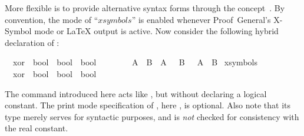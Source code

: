 \begin{isabellebody}
\begin{isamarkuptext}
  \medskip More flexible is to provide alternative syntax forms
  through the  concept~\cite{isabelle-ref}.  By
  convention, the mode of ``$xsymbols$'' is enabled whenever
  Proof~General's X-Symbol mode or {\LaTeX} output is active.  Now
  consider the following hybrid declaration of :%
\end{isamarkuptext}%
\isamarkuptrue%
%
\isadelimML
%
\endisadelimML
%
\isatagML
%
\endisatagML
{\isafoldML}%
%
\isadelimML
%
\endisadelimML
{}\isamarkupfalse%
\isanewline
\ \ xor\ {\isacharcolon}{\isacharcolon}\ {\isachardoublequoteopen}bool\ {\isasymRightarrow}\ bool\ {\isasymRightarrow}\ bool{\isachardoublequoteclose}\ \ \ \ {\isacharparenleft}\ {\isachardoublequoteopen}{\isacharbrackleft}{\isacharplus}{\isacharbrackright}{\isasymignore}{\isachardoublequoteclose}\ {}{}{\isacharparenright}\isanewline
\ \ {\isachardoublequoteopen}A\ {\isacharbrackleft}{\isacharplus}{\isacharbrackright}{\isasymignore}\ B\ {\isasymequiv}\ {\isacharparenleft}A\ {\isasymand}\ {\isasymnot}\ B{\isacharparenright}\ {\isasymor}\ {\isacharparenleft}{\isasymnot}\ A\ {\isasymand}\ B{\isacharparenright}{\isachardoublequoteclose}\isanewline
\isanewline
{}\isamarkupfalse%
\ {\isacharparenleft}xsymbols{\isacharparenright}\isanewline
\ \ xor\ {\isacharcolon}{\isacharcolon}\ {\isachardoublequoteopen}bool\ {\isasymRightarrow}\ bool\ {\isasymRightarrow}\ bool{\isachardoublequoteclose}\ \ \ \ {\isacharparenleft}\ {\isachardoublequoteopen}{\isasymoplus}{\isasymignore}{\isachardoublequoteclose}\ {}{}{\isacharparenright}%
\begin{isamarkuptext}%
The  command introduced here acts like
  , but without declaring a logical constant.  The
  print mode specification of , here , is optional.  Also note that its type merely serves
  for syntactic purposes, and is \emph{not} checked for consistency
  with the real constant.


\end{isamarkuptext}
\end{isabellebody}
